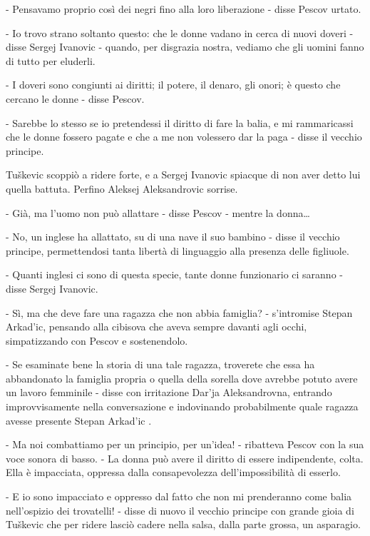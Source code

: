 - Pensavamo proprio così dei negri fino alla loro liberazione - disse Pescov urtato. 

- Io trovo strano soltanto questo: che le donne vadano in cerca di nuovi doveri - disse Sergej Ivanovic - quando, per disgrazia nostra, vediamo che gli uomini fanno di tutto per eluderli. 

- I doveri sono congiunti ai diritti; il potere, il denaro, gli onori; è questo che cercano le donne - disse Pescov. 

- Sarebbe lo stesso se io pretendessi il diritto di fare la balia, e mi rammaricassi che le donne fossero pagate e che a me non volessero dar la paga - disse il vecchio principe. 

Tuškevic scoppiò a ridere forte, e a Sergej Ivanovic spiacque di non aver detto lui quella battuta. Perfino Aleksej Aleksandrovic sorrise. 

- Già, ma l'uomo non può allattare - disse Pescov - mentre la donna\ldots{} 

- No, un inglese ha allattato, su di una nave il suo bambino - disse il vecchio principe, permettendosi tanta libertà di linguaggio alla presenza delle figliuole. 

- Quanti inglesi ci sono di questa specie, tante donne funzionario ci saranno - disse Sergej Ivanovic. 

- Sì, ma che deve fare una ragazza che non abbia famiglia? - s'intromise Stepan Arkad'ic, pensando alla cibisova che aveva sempre davanti agli occhi, simpatizzando con Pescov e sostenendolo. 

- Se esaminate bene la storia di una tale ragazza, troverete che essa ha abbandonato la famiglia propria o quella della sorella dove avrebbe potuto avere un lavoro femminile - disse con irritazione Dar'ja Aleksandrovna, entrando improvvisamente nella conversazione e indovinando probabilmente quale ragazza avesse presente Stepan Arkad'ic . 

- Ma noi combattiamo per un principio, per un'idea! - ribatteva Pescov con la sua voce sonora di basso. - La donna può avere il diritto di essere indipendente, colta. Ella è impacciata, oppressa dalla consapevolezza dell'impossibilità di esserlo. 

- E io sono impacciato e oppresso dal fatto che non mi prenderanno come balia nell'ospizio dei trovatelli! - disse di nuovo il vecchio principe con grande gioia di Tuškevic che per ridere lasciò cadere nella salsa, dalla parte grossa, un asparagio. 

